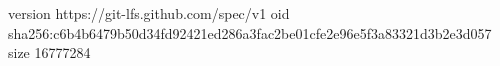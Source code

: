 version https://git-lfs.github.com/spec/v1
oid sha256:c6b4b6479b50d34fd92421ed286a3fac2be01cfe2e96e5f3a83321d3b2e3d057
size 16777284
